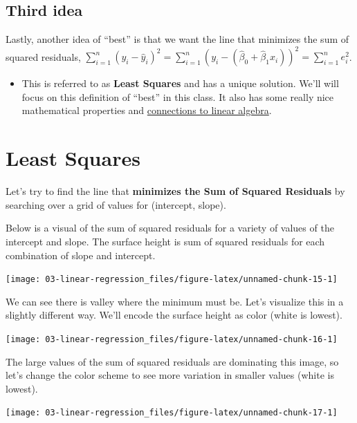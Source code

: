 \documentclass[
]{book}
\providecommand{\tightlist}{%
  \setlength{\itemsep}{0pt}\setlength{\parskip}{0pt}}
\begin{document}
\subsection{Third idea}\label{third-idea}

Lastly, another idea of ``best'' is that we want the line that minimizes the sum of squared residuals, \(\sum_{i=1}^n (y_i - \hat{y}_i)^2= \sum_{i=1}^n(y_i-( \hat{\beta}_0 + \hat{\beta}_1x_i))^2=\sum_{i=1}^n e_i^2\).

\begin{itemize}
\tightlist
\item
  This is referred to as \textbf{Least Squares} and has a unique solution. We'll will focus on this definition of ``best'' in this class. It also has some really nice mathematical properties and \href{https://medium.com/@andrew.chamberlain/the-linear-algebra-view-of-least-squares-regression-f67044b7f39b}{connections to linear algebra}.
\end{itemize}

\section{Least Squares}\label{least-squares}

Let's try to find the line that \textbf{minimizes the Sum of Squared Residuals} by searching over a grid of values for (intercept, slope).

Below is a visual of the sum of squared residuals for a variety of values of the intercept and slope. The surface height is sum of squared residuals for each combination of slope and intercept.

\begin{center}\texttt{[image: 03-linear-regression\_files/figure-latex/unnamed-chunk-15-1]} \end{center}

We can see there is valley where the minimum must be. Let's visualize this in a slightly different way. We'll encode the surface height as color (white is lowest).

\begin{center}\texttt{[image: 03-linear-regression\_files/figure-latex/unnamed-chunk-16-1]} \end{center}

The large values of the sum of squared residuals are dominating this image, so let's change the color scheme to see more variation in smaller values (white is lowest).

\begin{center}\texttt{[image: 03-linear-regression\_files/figure-latex/unnamed-chunk-17-1]} \end{center}
\end{document}
